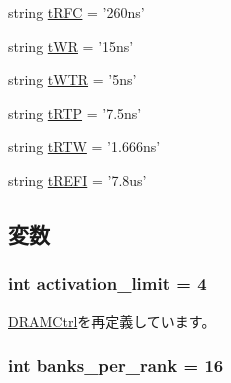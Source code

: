 \begin{DoxyCompactItemize}
string \hyperlink{classDRAMCtrl_1_1DDR4__2400__x64_a05307f048be759575436bb4a58206f04}{tRFC} = '260ns'
\item 
string \hyperlink{classDRAMCtrl_1_1DDR4__2400__x64_a9d8360f5123eaf9b5b6013adca83d1ae}{tWR} = '15ns'
\item 
string \hyperlink{classDRAMCtrl_1_1DDR4__2400__x64_a3c80caef2fc7879e455259bd9390d6d1}{tWTR} = '5ns'
\item 
string \hyperlink{classDRAMCtrl_1_1DDR4__2400__x64_ac0793c2fe127d7331efb7012e82dae77}{tRTP} = '7.5ns'
\item 
string \hyperlink{classDRAMCtrl_1_1DDR4__2400__x64_acbc9a68ca72d4052b4dd232251436d23}{tRTW} = '1.666ns'
\item 
string \hyperlink{classDRAMCtrl_1_1DDR4__2400__x64_af5f78c485be05aaae52d87151ee0cb92}{tREFI} = '7.8us'
\end{DoxyCompactItemize}


\subsection{変数}
\hypertarget{classDRAMCtrl_1_1DDR4__2400__x64_a8b6fa0e85fb36be7e08d5c992065d7c2}{
\subsubsection[{activation\_\-limit}]{\setlength{\rightskip}{0pt plus 5cm}int {\bf activation\_\-limit} = 4}}
\label{classDRAMCtrl_1_1DDR4__2400__x64_a8b6fa0e85fb36be7e08d5c992065d7c2}


\hyperlink{classDRAMCtrl_1_1DRAMCtrl_a96b5e1268f3ab4cfa8c9203598fd98c9}{DRAMCtrl}を再定義しています。\hypertarget{classDRAMCtrl_1_1DDR4__2400__x64_ac43360fda587200e99a090d69163e089}{
\subsubsection[{banks\_\-per\_\-rank}]{\setlength{\rightskip}{0pt plus 5cm}int {\bf banks\_\-per\_\-rank} = 16}}
\label{classDRAMCtrl_1_1DDR4__2400__x64_ac43360fda587200e99a090d69163e089}


